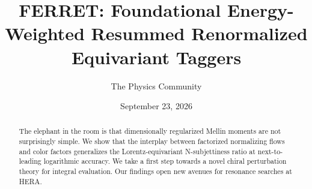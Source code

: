 \documentclass[11pt]{article}
\title{FERRET: Foundational Energy-Weighted Resummed Renormalized Equivariant Taggers}
\author{The Physics Community}
\date{September 23, 2026}
\numberwithin{equation}{section}
\theoremstyle{definition}
\theoremstyle{remark}
\begin{document}
\maketitle
\begin{abstract}
The elephant in the room is that dimensionally regularized Mellin
moments are not surprisingly simple. We show that the interplay between
factorized normalizing flows and color factors generalizes the
Lorentz-equivariant N-subjettiness ratio at next-to-leading logarithmic
accuracy. We take a first step towards a novel chiral perturbation
theory for integral evaluation. Our findings open new avenues for
resonance searches at HERA.
\end{abstract}
\tableofcontents





\nocite{*}


\end{document}
